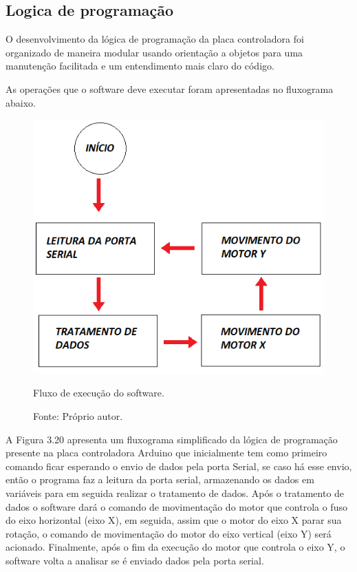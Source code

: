 \subsection{Logica de programação}

O desenvolvimento da lógica de programação da placa controladora foi organizado de maneira modular 
usando orientação a objetos para uma manutenção facilitada e um entendimento mais claro do código.

As operações que o software deve executar foram apresentadas no fluxograma abaixo.

\begin{figure}[!htb]
\centering
\includegraphics[scale = 0.7]{figuras/3-20}
\caption{Fluxo de execução do software.}
\caption*{Fonte: Próprio autor.}
\label{figfluxoexecucao}
\end{figure}
    
A Figura 3.20 apresenta um fluxograma simplificado da lógica de programação presente na placa controladora 
Arduino que inicialmente tem como primeiro comando ficar esperando o envio de dados pela porta Serial, 
se caso há esse envio, então o programa faz a leitura da porta serial, armazenando os dados em variáveis 
para em seguida realizar o tratamento de dados. Após o tratamento de dados o software dará o comando de 
movimentação do motor que controla o fuso do eixo horizontal (eixo X), em seguida, assim que o motor do 
eixo X parar sua rotação, o comando de movimentação do motor do eixo vertical (eixo Y) será acionado. 
Finalmente, após o fim da execução do motor que controla o eixo Y, o software volta a analisar se é enviado 
dados pela porta serial.


